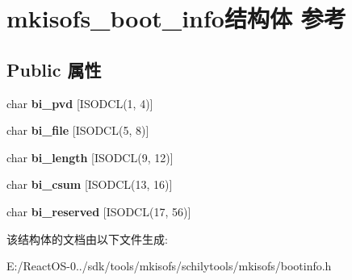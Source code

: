\hypertarget{structmkisofs__boot__info}{}\section{mkisofs\+\_\+boot\+\_\+info结构体 参考}
\label{structmkisofs__boot__info}
\subsection*{Public 属性}
\begin{DoxyCompactItemize}
\item 
\mbox{\label{structmkisofs__boot__info_a1cc06f43f7169e3ff461114d42e3de78}} 
char {\bfseries bi\+\_\+pvd} \mbox{[}I\+S\+O\+D\+CL(1, 4)\mbox{]}
\item 
\mbox{\label{structmkisofs__boot__info_af455478bccf3042b648b1796ef7c7e23}} 
char {\bfseries bi\+\_\+file} \mbox{[}I\+S\+O\+D\+CL(5, 8)\mbox{]}
\item 
\mbox{\label{structmkisofs__boot__info_a9f7d46d3ba5bad74396f2d062915bb17}} 
char {\bfseries bi\+\_\+length} \mbox{[}I\+S\+O\+D\+CL(9, 12)\mbox{]}
\item 
\mbox{\label{structmkisofs__boot__info_a1c024b11ba50d65652069df34f4ff149}} 
char {\bfseries bi\+\_\+csum} \mbox{[}I\+S\+O\+D\+CL(13, 16)\mbox{]}
\item 
\mbox{\label{structmkisofs__boot__info_a52e75695f8c508f74d7013f159880110}} 
char {\bfseries bi\+\_\+reserved} \mbox{[}I\+S\+O\+D\+CL(17, 56)\mbox{]}
\end{DoxyCompactItemize}


该结构体的文档由以下文件生成\+:\begin{DoxyCompactItemize}
\item 
E\+:/\+React\+O\+S-\/0../sdk/tools/mkisofs/schilytools/mkisofs/bootinfo.\+h\end{DoxyCompactItemize}
